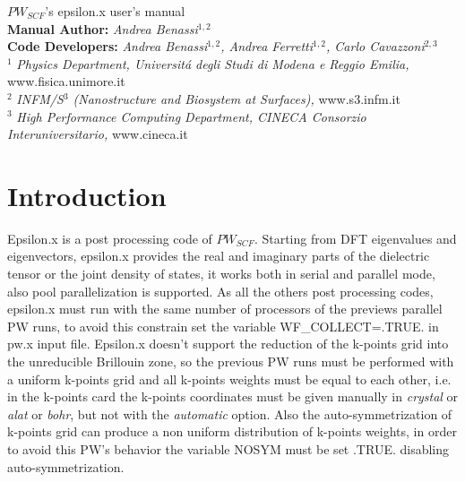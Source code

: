 \documentclass[twocolumn]{article}
\begin{document}
\begin{titlepage}
\Huge
\begin{center}
$PW_{SCF}$'s epsilon.x user's manual\\[4.5cm]
\normalsize
\vspace{10.5cm}
\textbf{Manual Author:}
\emph{Andrea Benassi}$^{1,2}$\\[0.3cm]
\textbf{Code Developers:}
\emph{Andrea Benassi$^{1,2}$, Andrea Ferretti$^{1,2}$, Carlo Cavazzoni$^{2,3}$}\\[1cm]
$^{1}$ \emph{Physics Department, Universit\'a degli Studi di Modena e Reggio Emilia,} www.fisica.unimore.it\\
$^{2}$ \emph{INFM/S$^{3}$ (Nanostructure and Biosystem at Surfaces),} www.s3.infm.it\\
$^{3}$ \emph{High Performance Computing Department, CINECA Consorzio Interuniversitario,} www.cineca.it\\
\end{center}
\end{titlepage}
\newpage
\section{Introduction}
Epsilon.x is a post processing code of $PW_{SCF}$. Starting from DFT eigenvalues and eigenvectors,
epsilon.x provides the real and imaginary parts of the dielectric tensor or the joint density of states, it works both in serial and
parallel mode, also pool parallelization is supported. As all the others post processing codes, epsilon.x must run with the same number of
processors of the previews parallel PW runs, to avoid this constrain set the variable WF\_COLLECT=.TRUE.
in pw.x input file.   
Epsilon.x doesn't support the reduction of the k-points grid into the unreducible Brillouin zone, so the previous PW runs must be
performed with a uniform k-points grid and all k-points weights must be equal to each other, i.e. in the k-points card the k-points
coordinates must be given manually in \emph{crystal} or \emph{alat} or \emph{bohr}, but not with the \emph{automatic} option. Also the
auto-symmetrization of k-points grid can produce a non uniform distribution of k-points weights, in order to avoid this
PW's behavior the variable NOSYM must be set .TRUE. disabling auto-symmetrization.
\end{document}
